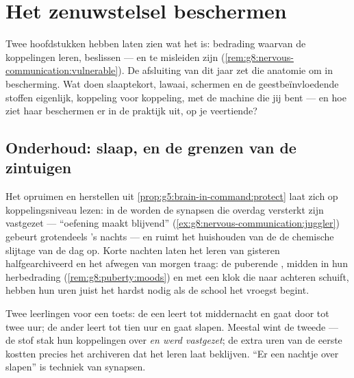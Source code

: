 \chapter{Het zenuwstelsel beschermen}\label{ch:g8:protecting-the-nervous-system}

Twee hoofdstukken hebben laten zien wat het  is: bedrading
waarvan de koppelingen leren, beslissen --- en te misleiden zijn
(\cref{rem:g8:nervous-communication:vulnerable}). De afsluiting van dit
jaar zet die anatomie om in bescherming. Wat doen slaaptekort, lawaai,
schermen en de geestbeïnvloedende stoffen eigenlijk, koppeling voor
koppeling, met de machine die jij bent --- en hoe ziet haar beschermen er
in de praktijk uit, op je veertiende?

\section{Onderhoud: slaap, en de grenzen van de zintuigen}

\begin{proposition}\label{prop:g8:protecting-the-nervous-system:sleep}
Het opruimen en herstellen uit
\cref{prop:g5:brain-in-command:protect} laat zich op koppelingsniveau
lezen: in de  worden de synapsen die overdag versterkt zijn
vastgezet --- ``oefening maakt blijvend''
(\cref{ex:g8:nervous-communication:juggler}) gebeurt grotendeels 's nachts
--- en ruimt het huishouden van de  de chemische slijtage van de
dag op. Korte nachten laten het leren van gisteren halfgearchiveerd en het
afwegen van morgen traag: de puberende , midden in hun
herbedrading (\cref{rem:g8:puberty:moods}) en met een klok die naar achteren
schuift, hebben hun uren juist het hardst nodig als de school het vroegst
begint.
\end{proposition}
\admitted

\begin{example}[De leerparadox]\label{ex:g8:protecting-the-nervous-system:revision}
Twee leerlingen voor een toets: de een leert tot middernacht en gaat door
tot twee uur; de ander leert tot tien uur en gaat slapen. Meestal wint de
tweede --- de stof stak hun koppelingen over \emph{en werd vastgezet}; de
extra uren van de eerste kostten precies het archiveren dat het leren laat
beklijven. ``Er een nachtje over slapen'' is techniek van synapsen.
\end{example}

